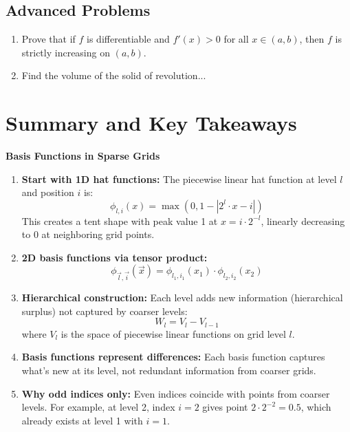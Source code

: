 \documentclass[11pt,a4paper]{article}
\begin{document}
\subsection{Advanced Problems}
\begin{enumerate}
    \item Prove that if $f$ is differentiable and $f'(x) > 0$ for all $x \in (a,b)$, 
          then $f$ is strictly increasing on $(a,b)$.
    \item Find the volume of the solid of revolution...
\end{enumerate}

\section{Summary and Key Takeaways}

\begin{keypoint}
    \textbf{Basis Functions in Sparse Grids}
    \begin{enumerate}
        \item \textbf{Start with 1D hat functions:} The piecewise linear hat function at level $l$ and position $i$ is:
        $$\phi_{l,i}(x) = \max(0, 1 - |2^l \cdot x - i|)$$
        This creates a tent shape with peak value 1 at $x = i \cdot 2^{-l}$, linearly decreasing to 0 at neighboring grid points.
        
        \item \textbf{2D basis functions via tensor product:} 
        $$\phi_{\vec{l},\vec{i}}(\vec{x}) = \phi_{l_1,i_1}(x_1) \cdot \phi_{l_2,i_2}(x_2)$$
        
        \item \textbf{Hierarchical construction:} Each level adds new information (hierarchical surplus) not captured by coarser levels:
        $$W_l = V_l - V_{l-1}$$
        where $V_l$ is the space of piecewise linear functions on grid level $l$.
        
        \item \textbf{Basis functions represent differences:} Each basis function captures what's new at its level, not redundant information from coarser grids.
        
        \item \textbf{Why odd indices only:} Even indices coincide with points from coarser levels. For example, at level 2, index $i=2$ gives point $2 \cdot 2^{-2} = 0.5$, which already exists at level 1 with $i=1$.
    \end{enumerate}
\end{keypoint}
\end{document}
